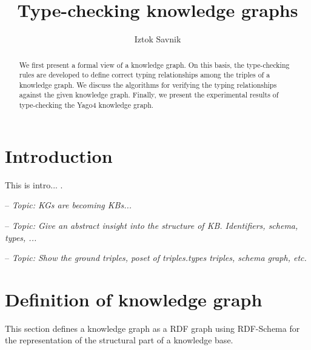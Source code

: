 \documentclass[runningheads]{llncs}
\newcommand{\notes}[1]{\noindent\begin{small}-- \emph{#1}\\\end{small}}
\begin{document}
\title{Type-checking knowledge graphs}

\author{Iztok Savnik} 



\maketitle

\begin{abstract}
  We first present a formal view of a knowledge graph. On this basis,
  the type-checking rules are developed to define correct typing
  relationships among the triples of a knowledge graph. We discuss the
  algorithms for verifying the typing relationships against the given
  knowledge graph. Finally, we present the experimental results of
  type-checking the Yago4 knowledge graph.

\end{abstract}


\thispagestyle{headings}
\tableofcontents
\newpage

\section{Introduction}

This is intro... \cite{Hogan22KGsSurveyCsur}.

\notes{Topic: KGs are becoming KBs...}

\notes{Topic: Give an abstract insight into the structure of KB. Identifiers, schema, types, ...}
\notes{Topic: Show the ground triples, poset of triples.types triples, schema graph, etc.}



\section{Definition of knowledge graph}

This section defines a knowledge graph as a RDF graph \cite{rdf} using
RDF-Schema \cite{rdfschema} for the representation of the structural
part of a knowledge base.
\end{document}
